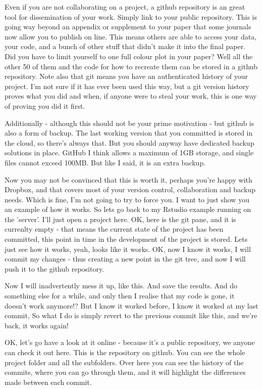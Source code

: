 \documentclass[12pt]{article}
\begin{document}
Even if you are not collaborating on a project, a github repository is an great tool for dissemination of your work. Simply link to your public repository. This is going way beyond an appendix or supplement to your paper that some journals now allow you to publish on line. This means others are able to access your data, your code, and a bunch of other stuff that didn't make it into the final paper. Did you have to limit yourself to one full colour plot in your paper? Well all the other 50 of them and the code for how to recreate them can be stored in a github repository. Note also that git means you have an authenticated history of your project. I'm not sure if it has ever been used this way, but a git version history proves what you did and when, if anyone were to steal your work, this is one way of proving you did it first. 

Additionally - although this should not be your prime motivation - but github is also a form of backup. The last working version that you committed is stored in the cloud, so there's always that. But you should anyway have dedicated backup solutions in place. GitHub I think allows a maximum of 1GB storage, and single files cannot exceed 100MB. But like I said, it is an extra backup. 

Now you may not be convinced that this is worth it, perhaps you're happy with Dropbox, and that covers most of your version control, collaboration and backup needs. Which is fine, I'm not going to try to force you. I want to just show you an example of how it works. So lets go back to my Rstudio example running on the 'server'. I'll just open a project here. OK, here is the git pane, and it is currenlty empty - that means the current state of the project has been committed, this point in time in the development of the project is stored. Lets just see how it works, yeah, looks like it works. OK, now I know it works, I will commit my changes - thus creating a new point in the git tree, and now I will push it to the github repository. 

Now I will inadvertently mess it up, like this. And save the results. And do something else for a while, and only then I realise that my code is gone, it doesn't work anymore!? But I know it worked before, I know it worked at my last commit, So what I do is simply revert to the previous commit like this, and we're back, it works again!

OK, let's go have a look at it online - because it's a public repository, we anyone can check it out here. This is the repository on github. You can see the whole project folder and all the subfolders. Over here you can see the history of the commits, where you can go through them, and it will highlight the differences made between each commit. 
\end{document}
